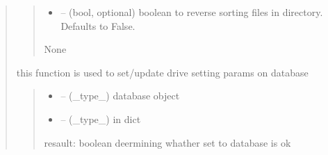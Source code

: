 \documentclass[letterpaper,10pt,english]{sphinxmanual}
\begin{document}
\begin{quote}
\begin{savenotes}
\begin{fulllineitems}
\begin{quote}
\begin{description}
\begin{itemize}
\item {} 
\sphinxAtStartPar
{} – (bool, optional) boolean to reverse sorting files in directory. Defaults to False.

\end{itemize}

\sphinxAtStartPar
None

\end{description}\end{quote}

\end{fulllineitems}\end{savenotes}


\begin{savenotes}\begin{fulllineitems}
\label{\detokenize{setting/backend/storage_funcs:oxin.backend.storage_funcs.set_camera_live_drive_parameters_to_db}}
\pysigstartsignatures
{}
\pysigstopsignatures
\sphinxAtStartPar
this function is used to set/update drive setting params on database
\begin{quote}\begin{description}
\begin{itemize}
\item {} 
\sphinxAtStartPar
{} – (\_type\_) database object

\item {} 
\sphinxAtStartPar
{} – (\_type\_) in dict

\end{itemize}

\sphinxAtStartPar
resault: boolean deermining whather set to database is ok

\end{description}\end{quote}

\end{fulllineitems}\end{savenotes}


\end{quote}
\end{document}
